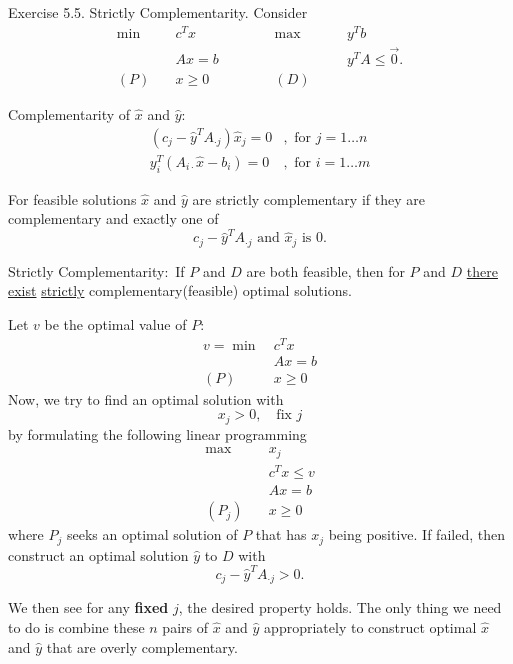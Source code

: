 \begin{eg}
	Exercise 5.5.  Strictly Complementarity.
	Consider
	\[
		\begin{alignedat}{5}
			\min~&c^{T}x\qquad\qquad&&\max ~&&y^{T}b\\
			&Ax = b 				&&		&&y^{T}A\leq \vec{0}.\\
			(P)\quad	&x\geq  0 	&&(D)\quad&&
		\end{alignedat}
	\]
	\begin{prev}
		Complementarity of \(\hat{x}\) and \(\hat{y}\)\(\colon\)
		\[
			\begin{split}
				(c_{j} - \hat{y}^{T} A_{\cdot j}) \hat{x}_j = 0&, \text{ for }j = 1\ldots n\\
				y^{T}_i (A_{i\cdot}\hat{x} - b_{i}) = 0&, \text{ for } i = 1\ldots m
			\end{split}
		\]
	\end{prev}

	\begin{definition}
		For feasible solutions \(\hat{x}\) and \(\hat{y}\) are strictly complementary if they are complementary and exactly one of
		\[
			c_{j} - \hat{y}^{T}A_{\cdot j}\text{ and }\hat{x}_j \text{ is } 0.
		\]
	\end{definition}

	\begin{theorem}
		Strictly Complementarity\(\colon\) If \(P\) and \(D\) are both feasible, then for \(P\) and \(D\) \underline{there exist} \underline{strictly}
		complementary(feasible) optimal solutions.
	\end{theorem}

	\begin{intuition}
		Let \(v\) be the optimal value of \(P\)\(\colon\)
		\begin{align*}
			v = \min~ & c^Tx    \\
			          & Ax = b  \\
			(P)\quad  & x\geq 0
		\end{align*}
		Now, we try to find an optimal solution with
		\[
			x_{j}>0, \quad \text{fix }j
		\]
		by formulating the following linear programming
		\begin{align*}
			\max~      & x_{j}        \\
			           & c^{T}x\leq v \\
			           & Ax = b       \\
			(P_j)\quad & x\geq  0
		\end{align*}
		where \(P_{j}\) seeks an optimal solution of \(P\) that has \(x_{j}\) being positive. If failed, then construct an optimal solution \(\hat{y}\) to \(D\) with
		\[
			c_{j} - \hat{y}^{T} A_{\cdot j}>0.
		\]

		We then see for any \textbf{fixed} \(j\), the desired property holds. The only thing we need to do is combine these \(n\) pairs of \(\hat{x}\) and \(\hat{y}\)
		appropriately to construct optimal \(\hat{x}\) and \(\hat{y}\) that are overly complementary.
	\end{intuition}
\end{eg}